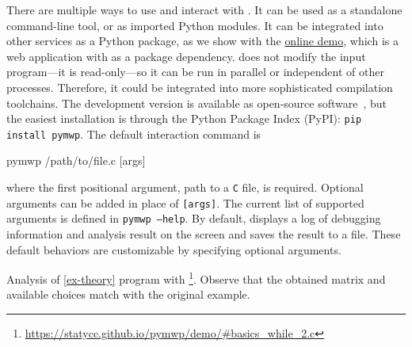 {{    There are multiple ways to use and interact with \pymwp. It can be used as a standalone command-line tool, or as
    imported Python modules. It can be integrated into other services as a Python package, as we show with the
    \href{https://statycc.github.io/pymwp/demo/}{\pymwps online demo}, which is a web application with \pymwps as a
    package dependency. \pymwps does not modify the input program---it is read-only---so it can be run in parallel or
    independent of other processes. Therefore, it could be integrated into more sophisticated compilation toolchains.
    The development version is available as open-source software~\cite{pymwp}, but the easiest installation is through
    the Python Package Index (PyPI): \texttt{pip install pymwp}. The default interaction command is

\begin{console}
pymwp /path/to/file.c [args]
\end{console}

\noindent where the first positional argument, path to a \texttt{C} file, is required. Optional arguments can be added in
place of \texttt{[args]}. The current list of supported arguments is defined in \texttt{pymwp ---help}. By default,
\pymwps displays a log of debugging information and analysis result on the screen and saves the result to
a file. These default behaviors are customizable by specifying optional arguments.

\begin{example}
    \label{ex-use}

    Analysis of \autoref{ex-theory} program with \pymwp\footnote{\url{https://statycc.github.io/pymwp/demo/\#basics_while_2.c}}.
    Observe that the obtained matrix and available choices match with the original example.

    \vspace{.5em}

\end{example}

\clearpage




}}
